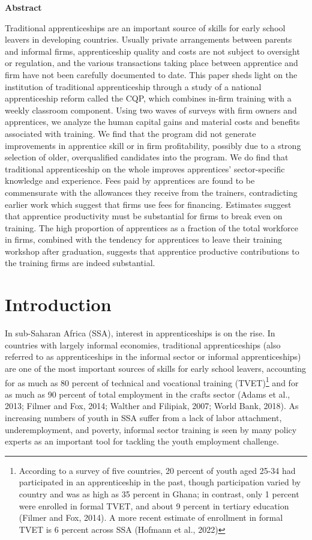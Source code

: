 \documentclass[
  11pt,
a4paper
]{report}
\newenvironment{chapabstract}{%
    \begin{center}%
      \bfseries Abstract
    \end{center}}%
   {\par}
\begin{document}
\normalsize
\begin{chapabstract}
Traditional apprenticeships are an important source of skills for early school leavers in developing countries. Usually private arrangements between parents and informal firms, apprenticeship quality and costs are not subject to oversight or regulation, and the various transactions taking place between apprentice and firm have not been carefully documented to date. This paper sheds light on the institution of traditional apprenticeship through a study of a national apprenticeship reform called the CQP, which combines in-firm training with a weekly classroom component. Using two waves of surveys with firm owners and apprentices, we analyze the human capital gains and material costs and benefits associated with training. We find that the program did not generate improvements in apprentice skill or in firm profitability, possibly due to a strong selection of older, overqualified candidates into the program. We do find that traditional apprenticeship on the whole improves apprentices' sector-specific knowledge and experience. Fees paid by apprentices are found to be commensurate with the allowances they receive from the trainers, contradicting earlier work which suggest that firms use fees for financing. Estimates suggest that apprentice productivity must be substantial for firms to break even on training. The high proportion of apprentices as a fraction of the total workforce in firms, combined with the tendency for apprentices to leave their training workshop after graduation, suggests that apprentice productive contributions to the training firms are indeed substantial.
\end{chapabstract}

\clearpage

\doublespacing

\hypertarget{intro}{%
\section{Introduction}\label{intro}}

In sub-Saharan Africa (SSA), interest in apprenticeships is on the rise. In countries with largely informal economies, traditional apprenticeships (also referred to as apprenticeships in the informal sector or informal apprenticeships) are one of the most important sources of skills for early school leavers, accounting for as much as 80 percent of technical and vocational training (TVET)\footnote{According to a survey of five countries, 20 percent of youth aged 25-34 had participated in an apprenticeship in the past, though participation varied by country and was as high as 35 percent in Ghana; in contrast, only 1 percent were enrolled in formal TVET, and about 9 percent in tertiary education (Filmer and Fox, 2014). A more recent estimate of enrollment in formal TVET is 6 percent across SSA (Hofmann et al., 2022)} and for as much as 90 percent of total employment in the crafts sector (Adams et al., 2013; Filmer and Fox, 2014; Walther and Filipiak, 2007; World Bank, 2018). As increasing numbers of youth in SSA suffer from a lack of labor attachment, underemployment, and poverty, informal sector training is seen by many policy experts as an important tool for tackling the youth employment challenge.
\end{document}
